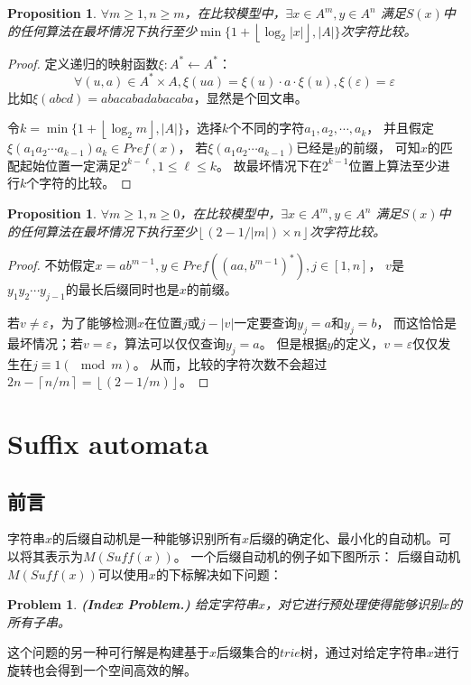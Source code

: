\documentclass[UTF8]{ctexart}
\newtheorem{prop}[thm]{Proposition}
\newtheorem{prob}[thm]{Problem}
\theoremstyle{definition}
\theoremstyle{remark}
\numberwithin{equation}{subsection}
\newcommand{\Emph}{\textbf}
\newcommand{\Suff}{\textit{Suff}}
\begin{document}
	\begin{prop}
		$\forall m \ge 1, n \ge m$，在比较模型中，$\exists x \in A^m, y \in A^n$
		满足$S(x)$中的任何算法在最坏情况下执行至少$\min \{1+\left\lfloor \log_2|x| \right\rfloor, |A| \}$次字符比较。
	\end{prop}
	\begin{proof}
		定义递归的映射函数$\xi : A^* \leftarrow A^*$：
		\[
			\forall (u,a) \in A^* \times A, \xi(ua) = \xi(u) \cdot a \cdot \xi(u), \xi(\varepsilon) = \varepsilon
		\]
		比如$\xi(abcd) = abacabadabacaba$，显然是个回文串。
		
		令$k = \min\{1 + \left\lfloor \log_2 m \right\rfloor, |A|\}$，选择$k$个不同的字符$a_1, a_2, \cdots, a_k$，
		并且假定$\xi(a_1 a_2 \cdots a_{k-1})a_k \in Pref(x)$，
		若$\xi(a_1 a_2 \cdots a_{k-1})$已经是$y$的前缀，
		可知$x$的匹配起始位置一定满足$2^{k-\ell}, 1 \le \ell \le k$。
		故最坏情况下在$2^{k-1}$位置上算法至少进行$k$个字符的比较。
	\end{proof}
	
	\begin{prop}
		$\forall m \ge 1, n \ge 0$，在比较模型中，$\exists x \in A^m, y \in A^n$
		满足$S(x)$中的任何算法在最坏情况下执行至少$\left\lfloor (2 - 1 / |m|) \times n \right\rfloor$次字符比较。
	\end{prop}
	\begin{proof}
		不妨假定$x = ab^{m-1}, y \in Pref((a{a,b}^{m-1})^*), j \in [1, n]$，
		$v$是$y_1 y_2 \cdots y_{j-1}$的最长后缀同时也是$x$的前缀。
		
		若$v \neq \varepsilon$，为了能够检测$x$在位置$j$或$j-|v|$一定要查询$y_j=a$和$y_j=b$，
		而这恰恰是最坏情况；若$v = \varepsilon$，算法可以仅仅查询$y_j = a$。
		但是根据$y$的定义，$v=\varepsilon$仅仅发生在$j \equiv 1 (\mod m)$。
		从而，比较的字符次数不会超过$2n - \left\lceil n / m \right\rceil = \left\lfloor (2 - 1 / m) \right\rfloor$。
	\end{proof}

\section{Suffix automata}

\subsection{前言}

	字符串$x$的后缀自动机是一种能够识别所有$x$后缀的确定化、最小化的自动机。可以将其表示为$M(\Suff(x))$。
	一个后缀自动机的例子如下图所示：
	后缀自动机$M(\Suff(x))$可以使用$x$的下标解决如下问题：
	\begin{prob}
		\Emph{(Index Problem.)} 给定字符串$x$，对它进行预处理使得能够识别$x$的所有子串。
	\end{prob}
	这个问题的另一种可行解是构建基于$x$后缀集合的$trie$树，通过对给定字符串$x$进行旋转也会得到一个空间高效的解。
	
\end{document}
